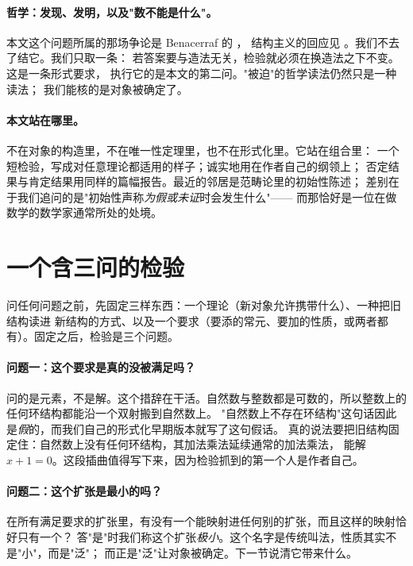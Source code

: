 \documentclass[aps,prd,preprint,superscriptaddress,amsmath,amssymb]{revtex4-2}
\begin{document}
\paragraph{哲学：发现、发明，以及"数不能是什么"。}
本文这个问题所属的那场争论是 Benacerraf 的 \cite{benacerraf1965}，
结构主义的回应见 \cite{shapiro1997}。我们不去了结它。我们只取一条：
若答案要与造法无关，检验就必须在换造法之下不变。这是一条形式要求，
执行它的是本文的第二问。"被迫"的哲学读法仍然只是一种读法；
我们能核的是对象被确定了。

\paragraph{本文站在哪里。}
不在对象的构造里，不在唯一性定理里，也不在形式化里。它站在组合里：
一个短检验，写成对任意理论都适用的样子；诚实地用在作者自己的纲领上；
否定结果与肯定结果用同样的篇幅报告。最近的邻居是范畴论里的初始性陈述；
差别在于我们追问的是"初始性声称\emph{为假或未证}时会发生什么"——
而那恰好是一位在做数学的数学家通常所处的处境。


\section{一个含三问的检验}
\label{sec:test}

问任何问题之前，先固定三样东西：一个理论（新对象允许携带什么）、一种把旧结构读进
新结构的方式、以及一个要求（要添的常元、要加的性质，或两者都有）。固定之后，检验是三个问题。

\paragraph{问题一：这个要求是真的没被满足吗？}
问的是元素，不是解。这个措辞在干活。自然数与整数都是可数的，所以整数上的任何环结构都能沿一个双射搬到自然数上。
"自然数上不存在环结构"这句话因此是\emph{假}的，而我们自己的形式化早期版本就写了这句假话。
真的说法要把旧结构固定住：自然数上没有任何环结构，其加法乘法延续通常的加法乘法，
能解 $x+1=0$。这段插曲值得写下来，因为检验抓到的第一个人是作者自己。

\paragraph{问题二：这个扩张是最小的吗？}
在所有满足要求的扩张里，有没有一个能映射进任何别的扩张，而且这样的映射恰好只有一个？
答"是"时我们称这个扩张\emph{极小}。这个名字是传统叫法，性质其实不是"小"，而是"泛"；
而正是"泛"让对象被确定。下一节说清它带来什么。
\end{document}
